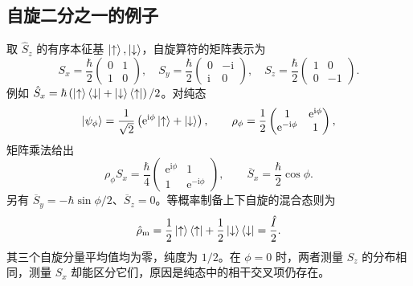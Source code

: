 \subsection{自旋二分之一的例子}
取 $\hat S_z$ 的有序本征基 $\Ket{\uparrow},\Ket{\downarrow}$，自旋算符的矩阵表示为
\begin{equation}
S_x=\frac\hbar2\left(\begin{matrix}0&1\\1&0\end{matrix}\right),\quad
S_y=\frac\hbar2\left(\begin{matrix}0&-\mathrm{i}\\\mathrm{i}&0\end{matrix}\right),\quad
S_z=\frac\hbar2\left(\begin{matrix}1&0\\0&-1\end{matrix}\right).
\end{equation}
例如 $\hat S_x=\hbar\left(\Ket{\uparrow}\Bra{\downarrow}+\Ket{\downarrow}\Bra{\uparrow}\right)/2$。对纯态
\begin{equation}
\Ket{\psi_\phi}=\frac1{\sqrt2}\left(\mathrm{e}^{\mathrm{i}\phi}\Ket{\uparrow}+\Ket{\downarrow}\right),\qquad
\rho_\phi=\frac12\left(\begin{matrix}1&\mathrm{e}^{\mathrm{i}\phi}\\\mathrm{e}^{-\mathrm{i}\phi}&1\end{matrix}\right),
\end{equation}
矩阵乘法给出
\begin{equation}
\rho_\phi S_x=\frac\hbar4\left(\begin{matrix}\mathrm{e}^{\mathrm{i}\phi}&1\\1&\mathrm{e}^{-\mathrm{i}\phi}\end{matrix}\right),\qquad
\overline S_x=\frac\hbar2\cos\phi.
\end{equation}
另有 $\overline S_y=-\hbar\sin\phi/2$、$\overline S_z=0$。等概率制备上下自旋的混合态则为
\begin{equation}
\hat\rho_{\mathrm m}=\frac12\Ket{\uparrow}\Bra{\uparrow}+\frac12\Ket{\downarrow}\Bra{\downarrow}=\frac{\hat I}{2}.
\end{equation}
其三个自旋分量平均值均为零，纯度为 $1/2$。在 $\phi=0$ 时，两者测量 $S_z$ 的分布相同，测量 $S_x$ 却能区分它们，原因是纯态中的相干交叉项仍存在。

